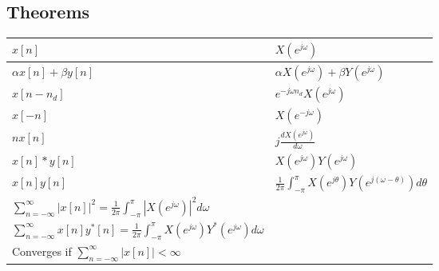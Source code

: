 \documentclass{article}
\begin{document}
\subsection*{Theorems}
\begin{center}
    \begin{tabularx}{\textwidth}{XX}
        \hline
        $x[n]$ & $X(e^{j\omega})$\\
        \hline
        $\alpha x[n]+\beta y[n]$ & $\alpha X(e^{j\omega}) + \beta Y(e^{j\omega})$\\
        $x[n-n_d]$ & $e^{-j\omega n_d}X(e^{j\omega})$\\
        $x[-n]$ & $X(e^{-j\omega})$\\
        $nx[n]$ & $j\frac{dX(e^{j\omega})}{d\omega}$\\
        $x[n] * y[n]$ & $X(e^{j\omega})Y(e^{j\omega})$\\
        $x[n]y[n]$ & $\frac{1}{2\pi}\int_{-\pi}^{\pi}X(e^{j\theta})Y(e^{j(\omega-\theta)})d\theta$\\
        $\sum_{n=-\infty}^{\infty}{|x[n]|^2}=\frac{1}{2\pi}\int_{-\pi}^{\pi}{|X(e^{j\omega})|^2d\omega}$ & \\
        $\sum_{n=-\infty}^{\infty}{x[n]y^*[n]}=\frac{1}{2\pi}\int_{-\pi}^{\pi}{X(e^{j\omega})Y^*(e^{j\omega})d\omega}$ &\\
        Converges if $\sum_{n=-\infty}^{\infty}|x[n]| < \infty$
    \end{tabularx}
\end{center}
\end{document}
